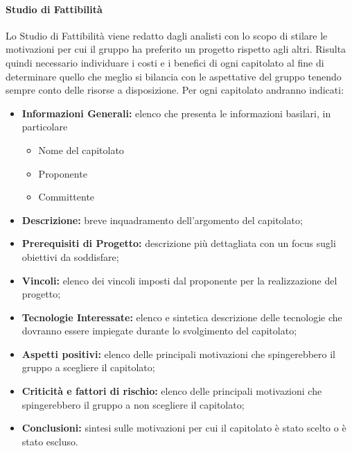 \paragraph{Studio di Fattibilità}
Lo Studio di Fattibilità viene redatto dagli analisti con lo scopo di stilare le motivazioni per cui il gruppo ha preferito un progetto rispetto agli altri.
Risulta quindi necessario individuare i costi e i benefici di ogni capitolato al fine di determinare quello che meglio si bilancia con le aspettative del gruppo tenendo sempre conto delle risorse a disposizione.
Per ogni capitolato andranno indicati:
\begin{itemize}
	\item \textbf{Informazioni Generali:} elenco che presenta le informazioni basilari, in particolare 
	\begin{itemize}
		\item Nome del capitolato
		\item Proponente
		\item Committente
	\end{itemize} 
	\item \textbf{Descrizione:} breve inquadramento dell'argomento del capitolato;
	\item \textbf{Prerequisiti di Progetto:} descrizione più dettagliata con un focus sugli obiettivi da soddisfare;
	\item \textbf{Vincoli:} elenco dei vincoli imposti dal proponente per la realizzazione del progetto;
	\item \textbf{Tecnologie Interessate:} elenco e sintetica descrizione delle tecnologie che dovranno essere impiegate durante lo svolgimento del capitolato;
	\item \textbf{Aspetti positivi:} elenco delle principali motivazioni che spingerebbero il gruppo a scegliere il capitolato;
	\item \textbf{Criticità e fattori di rischio:} elenco delle principali motivazioni che spingerebbero il gruppo a non scegliere il capitolato;
	\item \textbf{Conclusioni:} sintesi sulle motivazioni per cui il capitolato è stato scelto o è stato escluso.
\end{itemize}
